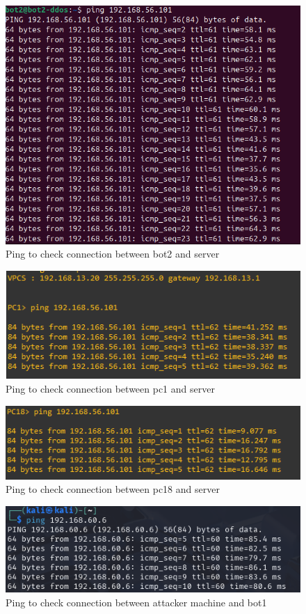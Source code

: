 \begin{figure}[htp]
    \centering
    \includegraphics[width=0.8\linewidth]{thesis/bot2ToServer.png}
    \caption{Ping to check connection between bot2 and server}
    \label{fig:enter-label}
\end{figure}
\begin{figure}[htp]
    \centering
    \includegraphics[width=0.8\linewidth]{thesis/pc1ToServer.png}
    \caption{Ping to check connection between pc1 and server}
    \label{fig:enter-label}
\end{figure}
\begin{figure}[!htp]
    \centering
    \includegraphics[width=0.8\linewidth]{thesis/pc18ToServer.png}
    \caption{Ping to check connection between pc18 and server}
    \label{fig:enter-label}
\end{figure}
\begin{figure}[!htb]
    \centering
    \includegraphics[width=0.8\linewidth]{thesis/kaliToBot1.png}
    \caption{Ping to check connection between attacker machine and bot1}
    \label{fig:enter-label}
\end{figure}

